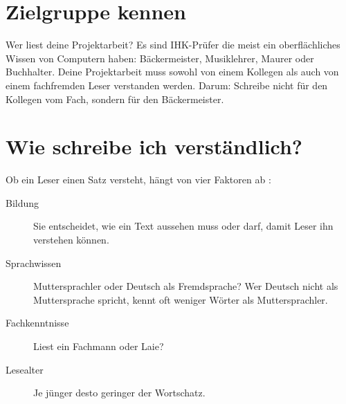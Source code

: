 \documentclass[a4paper,titlepage=true,twoside]{scrartcl}
\newcommand{\gquote}[1]{\glqq #1\grqq}
\begin{document}
%
%
%


\section{Zielgruppe kennen}
Wer liest deine Projektarbeit? Es sind IHK-Prüfer die meist ein oberflächliches Wissen von
Computern haben: Bäckermeister, Musiklehrer, Maurer oder Buchhalter.
Deine Projektarbeit muss sowohl von einem Kollegen als auch von einem fachfremden Leser
verstanden werden. Darum: Schreibe nicht für den Kollegen vom Fach, sondern für den Bäckermeister.


\section{Wie schreibe ich verständlich?}
Ob ein Leser einen Satz versteht, hängt von vier
Faktoren ab \cite{bib.baumert}:

\begin{description}
 \item[Bildung] Sie entscheidet, wie ein Text aussehen muss oder darf,
 damit Leser ihn verstehen können.
 \item[Sprachwissen] Muttersprachler oder Deutsch als Fremdsprache?
Wer Deutsch nicht als Muttersprache spricht, kennt oft weniger Wörter als Muttersprachler.
 \item[Fachkenntnisse] Liest ein Fachmann oder Laie?
 \item[Lesealter] Je jünger desto geringer der Wortschatz.
\end{description}
\end{document}
